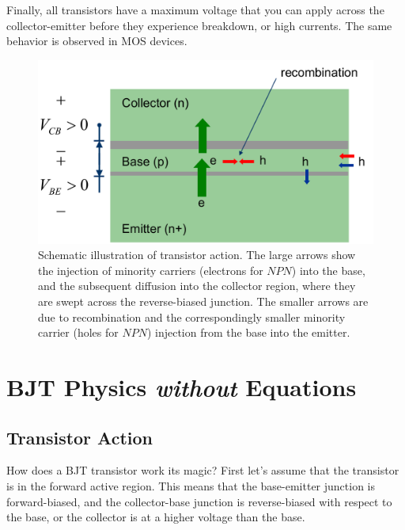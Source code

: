 Finally, all transistors have a maximum voltage that you can apply across the collector-emitter before they experience breakdown, or high currents.  The same behavior is observed in MOS devices.
\newpage
\begin{figure}[t]
\centering
\includegraphics[width=\columnwidth]{slide9_bjt_action}
\caption{Schematic illustration of transistor action.  The large arrows show the injection of minority carriers (electrons for $NPN$) into the base, and the subsequent diffusion into the collector region, where they are swept across the reverse-biased junction.  The smaller arrows are due to recombination and the correspondingly smaller minority carrier (holes for $NPN$) injection from the base into the emitter.}
\label{fig:slide9_bjt_action}
\end{figure}
\section{BJT Physics \emph{without} Equations}
\subsection{Transistor Action}
How does a BJT transistor work its magic?  First let's assume that the transistor is in the forward active region.  This means that the base-emitter junction is forward-biased, and the collector-base junction is reverse-biased with respect to the base, or the collector is at a higher voltage than the base.


